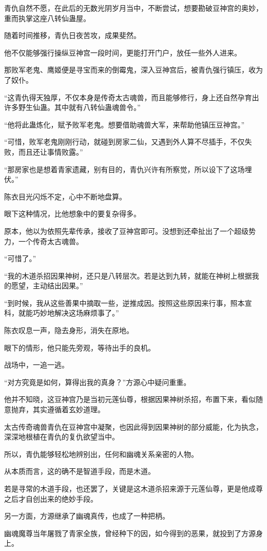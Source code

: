 \begin{this_body}
青仇自然不愿，在此后的无数光阴岁月当中，不断尝试，想要勘破豆神宫的奥妙，重而执掌这座八转仙蛊屋。

随着时间推移，青仇日夜苦攻，成果斐然。

他不仅能够强行操纵豆神宫一段时间，更能打开门户，放任一些外人进来。

那败军老鬼、鹰姬便是寻宝而来的倒霉鬼，深入豆神宫后，被青仇强行镇压，收为了奴仆。

“这青仇得天独厚，不仅本身是传奇太古魂兽，而且能够修行，身上还自然孕育出许多野生仙蛊。其中就有八转仙蛊魂兽令。”

“他将此蛊炼化，赋予败军老鬼。想要借助魂兽大军，来帮助他镇压豆神宫。”

“可惜，败军老鬼刚刚行动，就碰到房家二仙，又遇到外人算不尽插手，不仅失败，而且还让事情败露。”

“那房家也是想着青家遗藏，别有目的，青仇兴许有所察觉，所以设下了这场埋伏。”

陈衣目光闪烁不定，心中不断地盘算。

眼下这种情况，比他想象中的要复杂得多。

原本，他以为依照先辈传承，接收了豆神宫即可。没想到还牵扯出了一个超级势力，一个传奇太古魂兽。

“可惜了。”

“我的木道杀招因果神树，还只是八转层次。若是达到九转，就能在神树上根据我的愿望，主动结出因果。”

“到时候，我从这些善果中摘取一些，逆推成因。按照这些原因来行事，照本宣科，就能巧妙地解决这场麻烦事了。”

陈衣叹息一声，隐去身形，消失在原地。

眼下的情形，他只能先旁观，等待出手的良机。

战场中，一追一逃。

“对方究竟是如何，算得出我的真身？”方源心中疑问重重。

他并不知晓，这豆神宫乃是当初元莲仙尊，根据因果神树杀招，布置下来，看似随意抛弃，其实遵循着玄妙道理。

太古传奇魂兽青仇在豆神宫中凝聚，也因此得到因果神树的部分威能，化为执念，深深地根植在青仇的复仇欲望当中。

所以，青仇能够轻松地辨别出，任何和幽魂关系亲密的人物。

从本质而言，这的确不是智道手段，而是木道。

若是寻常的木道手段，也还罢了，关键是这木道杀招来源于元莲仙尊，更是他成尊之后才自创出来的绝妙手段。

另一方面，方源继承了幽魂真传，也成了一种把柄。

幽魂魔尊当年屠戮了青家全族，曾经种下的因，如今得到的恶果，就投到了方源身上。


\end{this_body}
